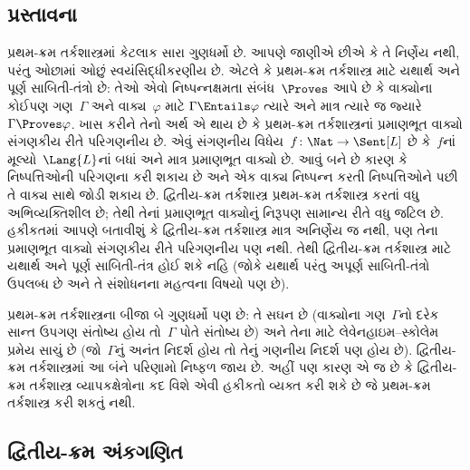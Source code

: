 
\subsection{પ્રસ્તાવના}\label{sol:met:int:sec}

પ્રથમ-ક્રમ તર્કશાસ્ત્રમાં કેટલાક સારા ગુણધર્મો છે. આપણે જાણીએ છીએ કે
તે નિર્ણેય નથી, પરંતુ ઓછામાં ઓછું સ્વયંસિદ્ધીકરણીય છે. એટલે કે
પ્રથમ-ક્રમ તર્કશાસ્ત્ર માટે યથાર્થ અને પૂર્ણ સાબિતી-તંત્રો છે: તેઓ
એવો નિષ્પન્નક્ષમતા સંબંધ~$\Proves$ આપે છે કે વાક્યોના કોઈપણ
ગણ~$\Gamma$ અને વાક્ય~$\varphi$ માટે $\Gamma \Entails \varphi$ ત્યારે અને માત્ર
ત્યારે જ જ્યારે $\Gamma \Proves \varphi$. ખાસ કરીને તેનો અર્થ એ થાય છે કે
પ્રથમ-ક્રમ તર્કશાસ્ત્રનાં પ્રમાણભૂત વાક્યો સંગણકીય રીતે પરિગણનીય છે. એવું સંગણનીય વિધેય~$f\colon \Nat \to
\Sent[L]$ છે કે~$f$નાં મૂલ્યો~$\Lang{L}$નાં બધાં અને માત્ર પ્રમાણભૂત
વાક્યો છે. આવું બને છે કારણ કે નિષ્પત્તિઓની પરિગણના
કરી શકાય છે અને એક વાક્ય નિષ્પન્ન કરતી નિષ્પત્તિઓને પછી
તે વાક્ય સાથે જોડી શકાય છે. દ્વિતીય-ક્રમ તર્કશાસ્ત્ર
પ્રથમ-ક્રમ તર્કશાસ્ત્ર કરતાં વધુ અભિવ્યક્તિશીલ છે; તેથી તેનાં
પ્રમાણભૂત વાક્યોનું નિરૂપણ સામાન્ય રીતે વધુ જટિલ છે. હકીકતમાં આપણે
બતાવીશું કે દ્વિતીય-ક્રમ તર્કશાસ્ત્ર માત્ર અનિર્ણેય જ નથી, પણ તેના
પ્રમાણભૂત વાક્યો સંગણકીય રીતે પરિગણનીય પણ નથી. તેથી દ્વિતીય-ક્રમ તર્કશાસ્ત્ર માટે યથાર્થ અને
પૂર્ણ સાબિતી-તંત્ર હોઈ શકે નહિ (જોકે યથાર્થ પરંતુ અપૂર્ણ સાબિતી-તંત્રો
ઉપલબ્ધ છે અને તે સંશોધનના મહત્વના વિષયો પણ છે).

પ્રથમ-ક્રમ તર્કશાસ્ત્રના બીજા બે ગુણધર્મો પણ છે: તે સઘન છે (વાક્યોના
ગણ~$\Gamma$નો દરેક સાન્ત ઉપગણ સંતોષ્ય હોય તો~$\Gamma$ પોતે સંતોષ્ય
છે) અને તેના માટે લેવેનહાઇમ--સ્કોલેમ પ્રમેય સાચું છે (જો~$\Gamma$નું
અનંત નિદર્શ હોય તો તેનું ગણનીય નિદર્શ પણ હોય છે).
દ્વિતીય-ક્રમ તર્કશાસ્ત્રમાં આ બંને પરિણામો નિષ્ફળ જાય છે. અહીં પણ
કારણ એ જ છે કે દ્વિતીય-ક્રમ તર્કશાસ્ત્ર વ્યાપકક્ષેત્રોના કદ વિશે એવી
હકીકતો વ્યક્ત કરી શકે છે જે પ્રથમ-ક્રમ તર્કશાસ્ત્ર કરી શકતું નથી.





\subsection{દ્વિતીય-ક્રમ અંકગણિત}\label{sol:met:spa:sec}

